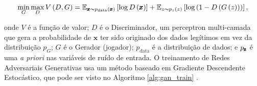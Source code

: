 \begin{equation}
    \min_{G} \max_{D} V\left(D, G\right) = \mathbb{E}_{\pmb{x}\thicksim p_{\text{data}}\left(\pmb{x}\right)}\left[\log D\left(\pmb{x}\right)\right] + \mathbb{E}_{z\thicksim p_{z}\left(z\right)}\left[\log \left(1 - D\left(G\left(z\right)\right)\right)\right],
    \label{eq:minimax}
    \vspace{0.2cm}
\end{equation}

\noindent onde $V$ é a função de valor; $D$ é o Discriminador, um perceptron multi-camada que gera a probabilidade de $\pmb{x}$ ter sido originado dos dados legítimos em vez da distribuição $p_{G}$; $G$ é o Gerador (jogador); $p_{\text{data}}$ é a distribuição de dados; e $p_{\text{\pmb{z}}}$ é uma \textit{a priori} nas variáveis de ruído de entrada. O treinamento de Redes Adversariais Generativas usa um método baseado em Gradiente Descendente Estocástico, que pode ser visto no Algoritmo \ref{alg:gan_train} \citep{NIPS2014_5423}.


